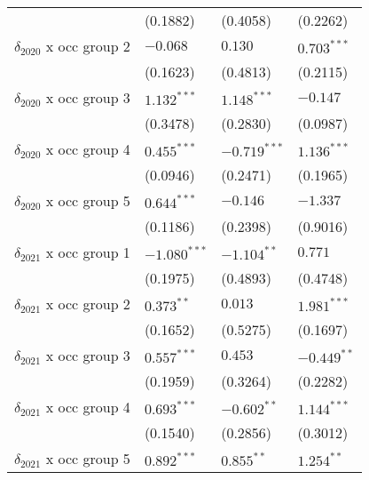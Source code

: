 \begin{tabular}{llll}
                                       &           (0.1882) &           (0.4058) &           (0.2262) \\
$\delta_{2020}$ x occ group 2          &           $-0.068$ &            $0.130$ &      $0.703^{***}$ \\
                                       &           (0.1623) &           (0.4813) &           (0.2115) \\
$\delta_{2020}$ x occ group 3          &      $1.132^{***}$ &      $1.148^{***}$ &           $-0.147$ \\
                                       &           (0.3478) &           (0.2830) &           (0.0987) \\
$\delta_{2020}$ x occ group 4          &      $0.455^{***}$ &     $-0.719^{***}$ &      $1.136^{***}$ \\
                                       &           (0.0946) &           (0.2471) &           (0.1965) \\
$\delta_{2020}$ x occ group 5          &      $0.644^{***}$ &           $-0.146$ &           $-1.337$ \\
                                       &           (0.1186) &           (0.2398) &           (0.9016) \\
$\delta_{2021}$ x occ group 1          &     $-1.080^{***}$ &      $-1.104^{**}$ &            $0.771$ \\
                                       &           (0.1975) &           (0.4893) &           (0.4748) \\
$\delta_{2021}$ x occ group 2          &       $0.373^{**}$ &            $0.013$ &      $1.981^{***}$ \\
                                       &           (0.1652) &           (0.5275) &           (0.1697) \\
$\delta_{2021}$ x occ group 3          &      $0.557^{***}$ &            $0.453$ &      $-0.449^{**}$ \\
                                       &           (0.1959) &           (0.3264) &           (0.2282) \\
$\delta_{2021}$ x occ group 4          &      $0.693^{***}$ &      $-0.602^{**}$ &      $1.144^{***}$ \\
                                       &           (0.1540) &           (0.2856) &           (0.3012) \\
$\delta_{2021}$ x occ group 5          &      $0.892^{***}$ &       $0.855^{**}$ &       $1.254^{**}$ \\

\end{tabular}
